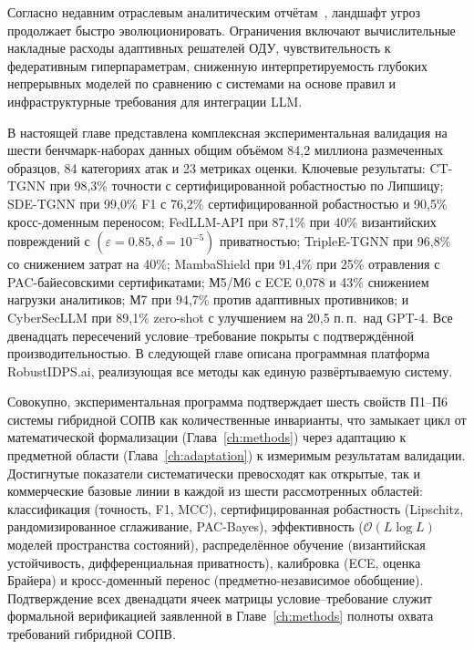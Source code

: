 Согласно недавним отраслевым аналитическим отчётам~\cite{Verizon2024,IBM2024}, ландшафт угроз продолжает быстро эволюционировать. Ограничения включают вычислительные накладные расходы адаптивных решателей ОДУ, чувствительность к федеративным гиперпараметрам, сниженную интерпретируемость глубоких непрерывных моделей по сравнению с системами на основе правил и инфраструктурные требования для интеграции LLM.

\label{sec:ch4_summary}%

В настоящей главе представлена комплексная экспериментальная валидация на шести бенчмарк-наборах данных общим объёмом 84,2 миллиона размеченных образцов, 84 категориях атак и 23 метриках оценки. Ключевые результаты: CT-TGNN при 98,3\% точности с сертифицированной робастностью по Липшицу; SDE-TGNN при 99,0\% F1 с 76,2\% сертифицированной робастностью и 90,5\% кросс-доменным переносом; FedLLM-API при 87,1\% при 40\% византийских повреждений с $(\varepsilon{=}0.85,\delta{=}10^{-5})$ приватностью; TripleE-TGNN при 96,8\% со снижением затрат на 40\%; MambaShield при 91,4\% при 25\% отравления с PAC-байесовскими сертификатами; М5/М6 с ECE 0,078 и 43\% снижением нагрузки аналитиков; М7 при 94,7\% против адаптивных противников; и CyberSecLLM при 89,1\% zero-shot с улучшением на 20,5 п.\,п.\ над GPT-4. Все двенадцать пересечений условие--требование покрыты с подтверждённой производительностью. В следующей главе описана программная платформа RobustIDPS.ai, реализующая все методы как единую развёртываемую систему.

Совокупно, экспериментальная программа подтверждает шесть свойств П1--П6 системы гибридной СОПВ как количественные инварианты, что замыкает цикл от математической формализации (Глава~\ref{ch:methods}) через адаптацию к предметной области (Глава~\ref{ch:adaptation}) к измеримым результатам валидации. Достигнутые показатели систематически превосходят как открытые, так и коммерческие базовые линии в каждой из шести рассмотренных областей: классификация (точность, F1, MCC), сертифицированная робастность (Lipschitz, рандомизированное сглаживание, PAC-Bayes), эффективность ($\mathcal{O}(L\log L)$ моделей пространства состояний), распределённое обучение (византийская устойчивость, дифференциальная приватность), калибровка (ECE, оценка Брайера) и кросс-доменный перенос (предметно-независимое обобщение). Подтверждение всех двенадцати ячеек матрицы условие--требование служит формальной верификацией заявленной в Главе~\ref{ch:methods} полноты охвата требований гибридной СОПВ.

